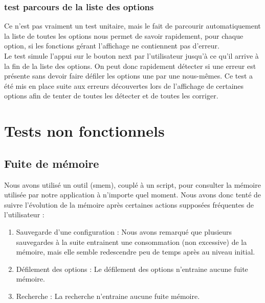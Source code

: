 \documentclass[16pts]{report}
\begin{document}
\subsubsection{test parcours de la liste des options}

Ce n'est pas vraiment un test unitaire, mais le fait de parcourir 
automatiquement la liste de toutes les options nous permet de savoir rapidement,
pour chaque option, si les fonctions gérant l'affichage ne contiennent pas 
d'erreur.
\\

Le test simule l'appui sur le bouton next par l'utilisateur jusqu'à ce qu'il
arrive à la fin de la liste des options. On peut donc rapidement détecter si 
une erreur est présente sans devoir faire défiler les options une par une 
nous-mêmes. Ce test a été mis en place suite aux erreurs découvertes lors de
l'affichage de certaines options afin de tenter de toutes les détecter et de 
toutes les corriger.\\


    \section{Tests non fonctionnels}
    \label{sec:Tests non fonctionnels}

\subsection{Fuite de mémoire}

Nous avons utilisé un outil (smem), couplé à un script, pour consulter la 
mémoire utilisée par notre application à n'importe quel moment. Nous avons 
donc tenté de suivre l'évolution de la mémoire après certaines actions supposées
fréquentes de l'utilisateur : \\

\begin{enumerate}
	\item Sauvegarde d'une configuration : Nous avons remarqué que 
          plusieurs sauvegardes à la suite entrainent une consommation 
          (non excessive) de la mémoire, mais elle semble redescendre
          peu de temps après au niveau initial.

	\item Défilement des options : Le défilement des options n'entraine
          aucune fuite mémoire.
	\item Recherche : La recherche n'entraine aucune fuite mémoire.
\end{enumerate}
\end{document}
